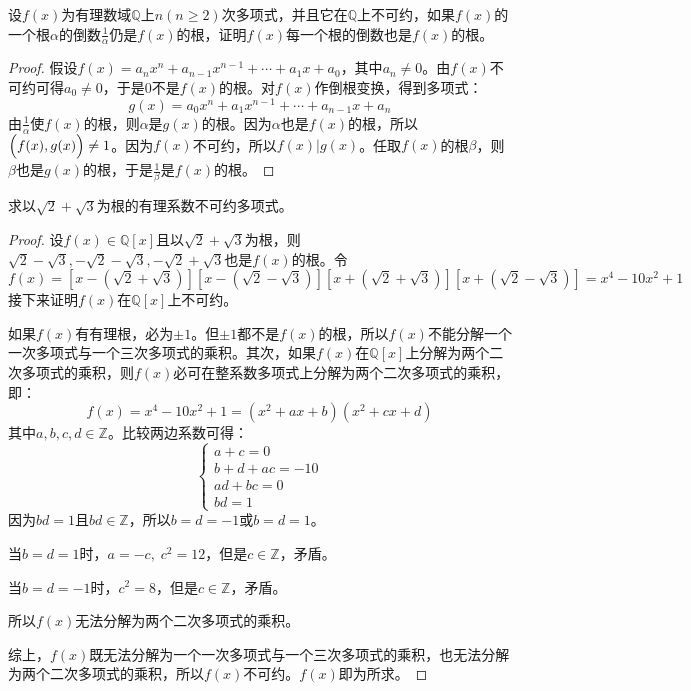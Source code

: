 \begin{theorem}
	设$f(x)$为有理数域$\mathbb{Q}$上$n(n\geqslant2)$次多项式，并且它在$\mathbb{Q}$上不可约，如果$f(x)$的一个根$\alpha$的倒数$\frac{1}{\alpha}$仍是$f(x)$的根，证明$f(x)$每一个根的倒数也是$f(x)$的根。
\end{theorem}
\begin{proof}
	假设$f(x)=a_nx^n+a_{n-1}x^{n-1}+\cdots+a_1x+a_0$，其中$a_n\ne0$。由$f(x)$不可约可得$a_0\ne0$，于是$0$不是$f(x)$的根。对$f(x)$作倒根变换，得到多项式：
	\begin{equation*}
		g(x)=a_0x^n+a_1x^{n-1}+\cdots+a_{n-1}x+a_n
	\end{equation*}
	由$\frac{1}{\alpha}$使$f(x)$的根，则$\alpha$是$g(x)$的根。因为$\alpha$也是$f(x)$的根，所以$\Bigl(f(x),g(x)\Bigr)\ne1$。因为$f(x)$不可约，所以$f(x)|g(x)$。任取$f(x)$的根$\beta$，则$\beta$也是$g(x)$的根，于是$\frac{1}{\beta}$是$f(x)$的根。
\end{proof}
\begin{theorem}
	求以$\sqrt{2}+\sqrt{3}$为根的有理系数不可约多项式。
\end{theorem}
\begin{proof}
	设$f(x)\in\mathbb{Q}[x]$且以$\sqrt{2}+\sqrt{3}$为根，则$\sqrt{2}-\sqrt{3},-\sqrt{2}-\sqrt{3},-\sqrt{2}+\sqrt{3}$也是$f(x)$的根。令
	\begin{equation*}
		f(x)=[x-(\sqrt{2}+\sqrt{3})][x-(\sqrt{2}-\sqrt{3})][x+(\sqrt{2}+\sqrt{3})][x+(\sqrt{2}-\sqrt{3})]=x^4-10x^2+1
	\end{equation*}
	接下来证明$f(x)$在$\mathbb{Q}[x]$上不可约。\par
	如果$f(x)$有有理根，必为$\pm1$。但$\pm1$都不是$f(x)$的根，所以$f(x)$不能分解一个一次多项式与一个三次多项式的乘积。其次，如果$f(x)$在$\mathbb{Q}[x]$上分解为两个二次多项式的乘积，则$f(x)$必可在整系数多项式上分解为两个二次多项式的乘积，即：
	\begin{equation*}
		f(x)=x^4-10x^2+1=(x^2+ax+b)(x^2+cx+d)
	\end{equation*}
	其中$a,b,c,d\in\mathbb{Z}$。比较两边系数可得：
	\begin{equation*}
		\begin{cases}
			a+c=0 \\
			b+d+ac=-10 \\
			ad+bc=0 \\
			bd=1
		\end{cases}
	\end{equation*}
	因为$bd=1$且$bd\in\mathbb{Z}$，所以$b=d=-1$或$b=d=1$。\par
	当$b=d=1$时，$a=-c,\;c^2=12$，但是$c\in\mathbb{Z}$，矛盾。\par
	当$b=d=-1$时，$c^2=8$，但是$c\in\mathbb{Z}$，矛盾。\par
	所以$f(x)$无法分解为两个二次多项式的乘积。\par
	综上，$f(x)$既无法分解为一个一次多项式与一个三次多项式的乘积，也无法分解为两个二次多项式的乘积，所以$f(x)$不可约。$f(x)$即为所求。
\end{proof}

